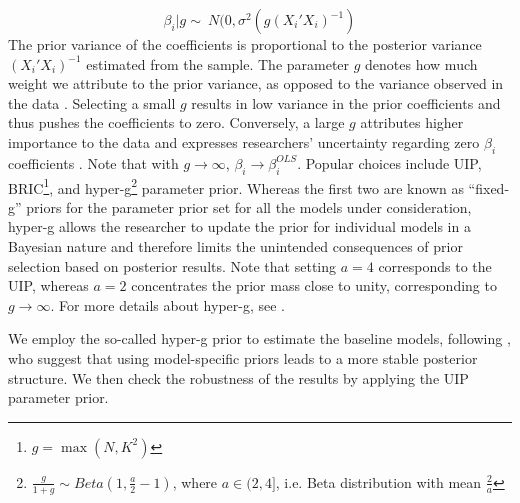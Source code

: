 \documentclass[a4paper,11pt]{article}
\begin{document}
\begin{equation}
\beta_{i}\vert g \sim\ N(0, \sigma^{2}(g(X_{i}'X_{i})^{-1}) 
\end{equation}
The prior variance of the coefficients is proportional to the posterior variance $(X_{i}'X_{i})^{-1}$ estimated from the sample. The parameter $g$ denotes how much weight we attribute to the prior variance, as opposed to the variance observed in the data \citep{FeldkircherZeugner2009}. Selecting a small $g$ results in low variance in the prior coefficients and thus pushes the coefficients to zero. Conversely, a large $g$ attributes higher importance to the data and expresses researchers' uncertainty regarding zero $\beta_{i}$ coefficients \citep{Zeugner2011}. Note that with $g \rightarrow \infty$, $\beta_{i} \rightarrow \beta^{OLS}_{i}$. Popular choices include \ac{UIP}, BRIC\footnote{$g = \max({N, K^{2}})$}, and hyper-g\footnote{$\frac{g}{1+g} \sim Beta (1, \frac{a}{2} - 1)$, where $a \in (2,4]$, i.e. Beta distribution with mean $\frac{2}{a}$} parameter prior.
%
Whereas the first two are known as ``fixed-g'' priors for the parameter prior set for all the models under consideration, hyper-g allows the researcher to update the prior for individual models in a Bayesian nature and therefore limits the unintended consequences of prior selection based on posterior results. Note that setting $a=4$ corresponds to the \ac{UIP}, whereas $a=2$ concentrates the prior mass close to unity, corresponding to $g \rightarrow \infty$. For more details about hyper-g, see \citet{Liangetal2008}.

We employ the so-called hyper-g prior to estimate the baseline models, following \citet{FeldkircherZeugner2009}, who suggest that using model-specific priors leads to a more stable posterior structure. We then check the robustness of the results by applying the \ac{UIP} parameter prior.
\end{document}
